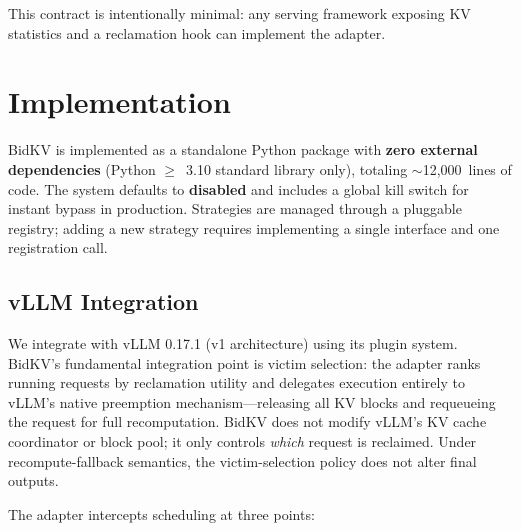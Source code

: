 \documentclass[sigconf,nonacm]{acmart}
\newcommand{\bidkv}{BidKV\xspace}
\begin{document}
This contract is intentionally minimal: any serving framework exposing KV
statistics and a reclamation hook can implement the adapter.

\section{Implementation}\label{sec:impl}

\bidkv is implemented as a standalone Python package with \textbf{zero external
dependencies} (Python $\geq$~3.10 standard library only), totaling
$\sim$12,000~lines of code.  The system defaults to \textbf{disabled}
and includes a global kill switch for instant bypass in production.
Strategies are managed through a pluggable registry; adding a new strategy
requires implementing a single interface and one registration call.

\subsection{vLLM Integration}\label{sec:impl:vllm}

We integrate with vLLM 0.17.1 (v1 architecture) using its plugin system.
\bidkv's fundamental integration point is victim selection: the adapter
ranks running requests by reclamation utility and delegates execution
entirely to vLLM's native preemption mechanism---releasing all KV blocks
and requeueing the request for full recomputation.  \bidkv does not modify
vLLM's KV cache coordinator or block pool; it only controls \emph{which}
request is reclaimed.  Under recompute-fallback semantics, the
victim-selection policy does not alter final outputs.

The adapter intercepts scheduling at three points:
\end{document}
